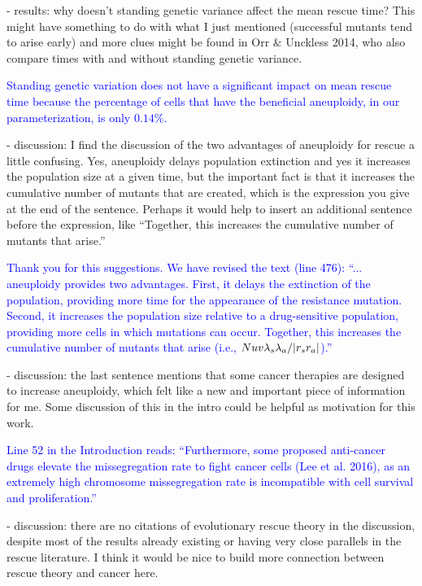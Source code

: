 \documentclass[12pt]{extarticle}
\renewcommand{\Delta}{r}
\begin{document}
- results: why doesn't standing genetic variance affect the mean rescue time? This might have something to do with what I just mentioned (successful mutants tend to arise early) and more clues might be found in Orr $\&$ Unckless 2014, who also compare times with and without standing genetic variance.

\textcolor{blue}{Standing genetic variation does not have a significant impact on mean rescue time because the percentage of cells that have the beneficial aneuploidy, in our parameterization, is only $0.14\%$.} 

- discussion: I find the discussion of the two advantages of aneuploidy for rescue a little confusing. Yes, aneuploidy delays population extinction and yes it increases the population size at a given time, but the important fact is that it increases the cumulative number of mutants that are created, which is the expression you give at the end of the sentence. Perhaps it would help to insert an additional sentence before the expression, like ``Together, this increases the cumulative number of mutants that arise.''

\textcolor{blue}{%
Thank you for this suggestions. We have revised the text (line 476): ``... aneuploidy provides two advantages. First, it delays the extinction of the population, providing more time for the appearance of the resistance mutation. Second, it increases the population size relative to a drug-sensitive population, providing more cells in which mutations can occur. Together, this increases the cumulative number of mutants that arise (i.e., $Nuv\lambda_s\lambda_a/\abs{\Delta_s\Delta_a}$).''
} 

- discussion: the last sentence mentions that some cancer therapies are designed to increase aneuploidy, which felt like a new and important piece of information for me. Some discussion of this in the intro could be helpful as motivation for this work.

\textcolor{blue}{%
Line 52 in the Introduction reads: ``Furthermore, some proposed anti-cancer drugs elevate the missegregation rate to fight cancer cells (Lee et al. 2016), as an extremely high chromosome missegregation rate is incompatible with cell survival and proliferation.''
} 

- discussion: there are no citations of evolutionary rescue theory in the discussion, despite most of the results already existing or having very close parallels in the rescue literature. I think it would be nice to build more connection between rescue theory and cancer here.
\end{document}
